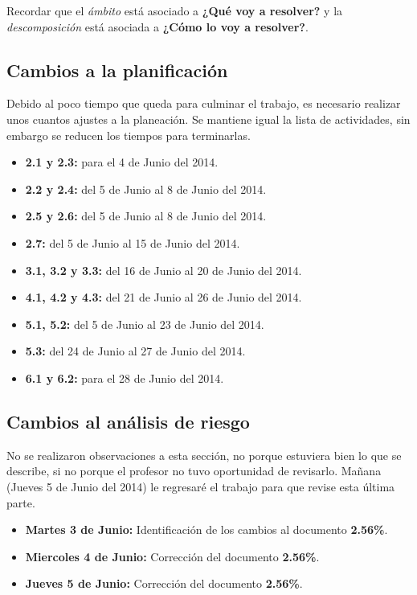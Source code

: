 \documentclass[letterpaper]{article}
\begin{document}
Recordar que el \emph{ámbito} está asociado a \textbf{¿Qué voy a resolver?} y la \emph{descomposición} está asociada a \textbf{¿Cómo lo voy a resolver?}.

\subsection{Cambios a la planificación}
Debido al poco tiempo que queda para culminar el trabajo, es necesario realizar unos cuantos ajustes a la planeación. Se mantiene igual la lista de actividades, sin embargo se reducen los tiempos para terminarlas.

\begin{itemize}
\item \textbf{2.1 y 2.3:} para el 4 de Junio del 2014.
\item \textbf{2.2 y 2.4:} del 5 de Junio al 8 de Junio del 2014.
\item \textbf{2.5 y 2.6:} del 5 de Junio al 8 de Junio del 2014.
\item \textbf{2.7:} del 5 de Junio al 15 de Junio del 2014.
\item \textbf{3.1, 3.2 y 3.3:} del 16 de Junio al 20 de Junio del 2014.
\item \textbf{4.1, 4.2 y 4.3:} del 21 de Junio al 26 de Junio del 2014.
\item \textbf{5.1, 5.2:} del 5 de Junio al 23 de Junio del 2014.
\item \textbf{5.3:} del 24 de Junio al 27 de Junio del 2014.
\item \textbf{6.1 y 6.2:} para el 28 de Junio del 2014.
\end{itemize}

\subsection{Cambios al análisis de riesgo}
No se realizaron observaciones a esta sección, no porque estuviera bien lo que se describe, si no porque el profesor no tuvo oportunidad de revisarlo. Mañana (Jueves 5 de Junio del 2014) le regresaré el trabajo para que revise esta última parte.

\begin{itemize}
\item \textbf{Martes 3 de Junio:} Identificación de los cambios al documento \textbf{2.56\%}.
\item \textbf{Miercoles 4 de Junio:} Corrección del documento \textbf{2.56\%}.
\item \textbf{Jueves 5 de Junio:} Corrección del documento \textbf{2.56\%}.
\end{itemize}
\end{document}
